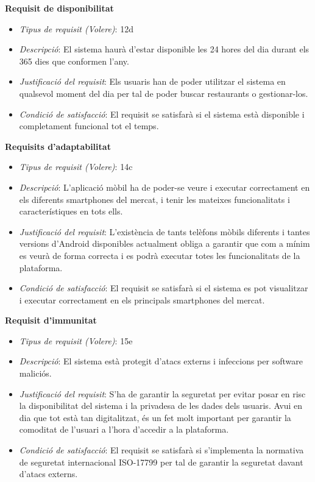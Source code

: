 \noindent\textbf{Requisit de disponibilitat}
\begin{itemize}
\item \textit{Tipus de requisit (Volere)}: 12d
\item \textit{Descripció}: El sistema haurà d'estar disponible les 24 hores del dia durant els 365 dies que conformen l'any.
\item \textit{Justificació del requisit}: Els usuaris han de poder utilitzar el sistema en qualsevol moment del dia per tal de poder buscar restaurants o gestionar-los.
\item \textit{Condició de satisfacció}: El requisit se satisfarà si el sistema està disponible i completament funcional tot el temps.
\end{itemize}

\noindent\textbf{Requisits d'adaptabilitat}
\begin{itemize}
\item \textit{Tipus de requisit (Volere)}: 14c
\item \textit{Descripció}: L'aplicació mòbil ha de poder-se veure i executar correctament en els diferents smartphones del mercat, i tenir les mateixes funcionalitats i característiques en tots ells.
\item \textit{Justificació del requisit}: L'existència de tants telèfons mòbils diferents i tantes versions d'Android disponibles actualment obliga a garantir que com a mínim es veurà de forma correcta i es podrà executar totes les funcionalitats de la plataforma.
\item \textit{Condició de satisfacció}: El requisit se satisfarà si el sistema es pot visualitzar i executar correctament en els principals smartphones del mercat.
\end{itemize}

\noindent\textbf{Requisit d'immunitat}
\begin{itemize}
\item \textit{Tipus de requisit (Volere)}: 15e
\item \textit{Descripció}: El sistema està protegit d'atacs externs i infeccions per software maliciós.
\item \textit{Justificació del requisit}: S'ha de garantir la seguretat per evitar posar en risc la disponibilitat del sistema i la privadesa de les dades dels usuaris. Avui en dia que tot està tan digitalitzat, és un fet molt important per garantir la comoditat de l'usuari a l'hora d'accedir a la plataforma.
\item \textit{Condició de satisfacció}: El requisit se satisfarà si s'implementa la normativa de seguretat internacional ISO-17799\cite{iso17799} per tal de garantir la seguretat davant d'atacs externs.
\end{itemize}

